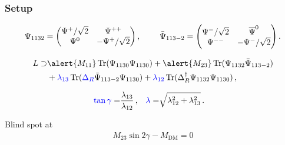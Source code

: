 \documentclass[%
xcolor=dvipsnames,table%
]{beamer}
\begin{document}
\begin{frame}
  \frametitle{Setup}

\begin{equation}
\Psi_{1132} = 
 \begin{pmatrix}
  \Psi^{+}/\sqrt{2} & \Psi^{++}  \\
  \Psi^{0} & -\Psi^{+}/\sqrt{2} \\
 \end{pmatrix}, \hspace{0.8cm}
{\bar\Psi}_{113-2} = 
 \begin{pmatrix}
  \Psi^{-}/\sqrt{2} & \overline{\Psi}^{0}  \\
  \Psi^{--} & -\Psi^{-}/\sqrt{2} \\
 \end{pmatrix}.
\end{equation}


  \begin{align}
L\supset &\alert{M_{11}}\operatorname{Tr}(\Psi_{1130}\Psi_{1130})+\alert{M_{23}}\operatorname{Tr}(\Psi_{1132}{\bar\Psi}_{113-2})\nonumber\\
&+{\color{blue}\lambda_{13}}\operatorname{Tr}({\color{blue}\Delta_{R}}{\bar\Psi}_{113-2}\Psi_{1130})
+{\color{blue}\lambda_{12}}\operatorname{Tr}(\Delta^{\dagger}_{R}\Psi_{1132} \Psi_{1130})\, ,
\end{align}

\begin{align}
{\color{blue}\tan\gamma}=&\frac{\lambda_{13}}{\lambda_{12}}\,,& {\color{blue} \lambda}=&\sqrt{\lambda_{12}^2+\lambda_{13}^2}\,.
\end{align}

Blind spot at
\begin{align}
  M_{23}\sin2\gamma - M_{\text{DM}}=0
\end{align}

\end{frame}
\end{document}
